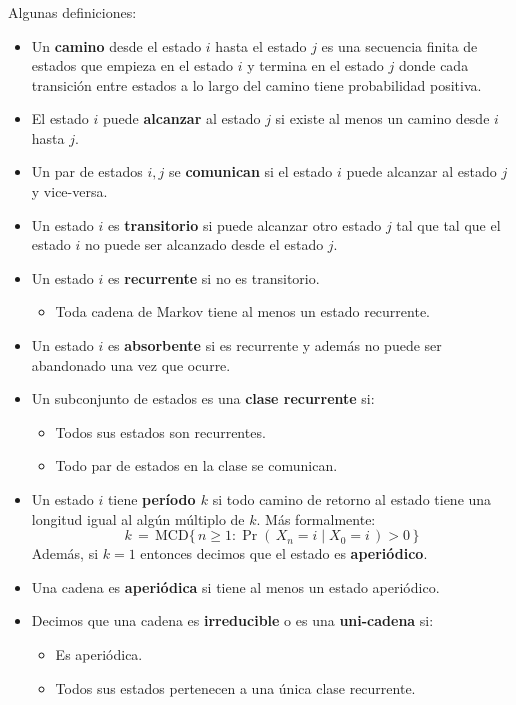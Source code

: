 \documentclass[ 10pt, xcolor = dvipsnames]{beamer}
\begin{document}
\begin{frame}[allowframebreaks]
\frametitle{\insertsubsection}

Algunas definiciones:
\begin{itemize}
\item Un \textbf{camino} desde el estado $i$ hasta el estado $j$ es una secuencia finita de estados que empieza en el estado $i$ y termina en el estado $j$ donde cada transici\'on entre estados a lo largo del camino tiene probabilidad positiva. 
\item El estado $i$ puede \textbf{alcanzar} al estado $j$ si existe al menos un camino \linebreak desde $i$ hasta $j$. 
\item Un par de estados $i,j$ se \textbf{comunican} si el estado $i$ puede alcanzar al \linebreak estado $j$ y vice-versa. 
\item Un estado $i$ es \textbf{transitorio} si puede alcanzar otro estado $j$ tal que tal que \linebreak el estado $i$ no puede ser alcanzado desde el estado $j$. 
\item Un estado $i$ es \textbf{recurrente} si no es transitorio. 
\begin{itemize}
\item Toda cadena de Markov tiene al menos un estado recurrente. 
\end{itemize}
\framebreak
\item Un estado $i$ es \textbf{absorbente} si es recurrente y adem\'as no puede ser abandonado una vez que ocurre. 
\item Un subconjunto de estados es una \textbf{clase recurrente} si:
\begin{itemize}
\item Todos sus estados son recurrentes. 
\item Todo par de estados en la clase se comunican. 
\end{itemize}
\item Un estado $i$ tiene \textbf{per\'iodo $k$} si todo camino de retorno al estado tiene una longitud igual al alg\'un m\'ultiplo de $k$. M\'as formalmente:
\[
k \, = \, \text{MCD} \{ \, n \geq 1 \colon \Pr( \, X_n = i \mid X_0 = i \, ) > 0 \, \}
\]
Adem\'as, si $k = 1$ entonces decimos que el estado es \textbf{aperi\'odico}. 
\item Una cadena es \textbf{aperi\'odica} si tiene al menos un estado aperi\'odico. 
\framebreak
\item Decimos que una cadena es \textbf{irreducible} o es una \textbf{uni-cadena} si: 
\begin{itemize}
\item Es aperi\'odica. 
\item Todos sus estados pertenecen a una \'unica clase recurrente. 
\end{itemize}
\end{itemize}
\fullskip


\end{frame}
\end{document}
